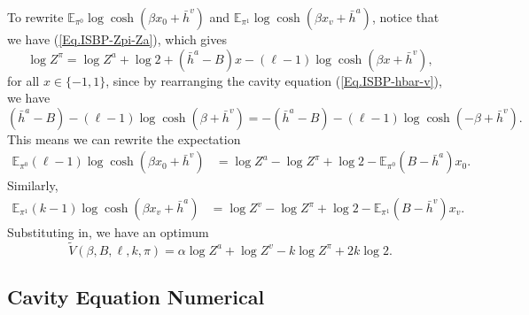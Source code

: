 \documentclass[12pt]{article}
\numberwithin{equation}{section}
\begin{document}
To rewrite $\mathbb{E}_{\pi^0} \log\cosh(\beta x_0 + \bar{h}^v)$ and $\mathbb{E}_{\pi^1} \log\cosh(\beta x_v + \bar{h}^a)$,
notice that we have (\ref{Eq.ISBP-Zpi-Za}), which gives
\begin{equation}
    \log Z^\pi = \log Z^a + \log 2 + (\bar{h}^a - B)x - (\ell - 1) \log \cosh(\beta x + \bar{h}^v),
\end{equation}
for all $x\in\{-1, 1\}$, since by rearranging the cavity equation (\ref{Eq.ISBP-hbar-v}), we have
\begin{equation*}
    (\bar{h}^a - B) - (\ell - 1) \log \cosh(\beta + \bar{h}^v) = -(\bar{h}^a - B) - (\ell - 1) \log \cosh(-\beta + \bar{h}^v).
\end{equation*}
This means we can rewrite the expectation
\begin{align*}
    \mathbb{E}_{\pi^0} (\ell - 1) \log\cosh(\beta x_0 + \bar{h}^v) & = \log Z^a - \log Z^\pi + \log 2 - \mathbb{E}_{\pi^0} (B - \bar{h}^a)x_0.
\end{align*}
Similarly,
\begin{align*}
    \mathbb{E}_{\pi^1} (k - 1) \log\cosh(\beta x_v + \bar{h}^a) & = \log Z^v - \log Z^\pi + \log 2 - \mathbb{E}_{\pi^1} (B - \bar{h}^v)x_v.
\end{align*}
Substituting in, we have an optimum
\begin{equation}
    \widetilde{V}(\beta, B, \ell, k, \pi) = \alpha \log Z^a + \log Z^v - k \log Z^\pi + 2k\log 2.
    \label{Eq.ISBP-AP-Z-form}
\end{equation}

\subsection{Cavity Equation Numerical}
\end{document}
